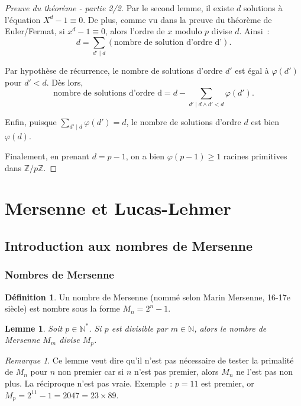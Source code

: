 \documentclass[10pt, mathserif]{beamer}
\newcommand{\Z}{\mathbb Z}
\newcommand{\N}{\mathbb N}
\newtheorem{lem}[thm]{Lemme}
\theoremstyle{definition}
\newtheorem{déf}[thm]{Définition}
\theoremstyle{remark}
\newtheorem*{rmq}{Remarque}
\begin{document}
	\begin{frame}
		\begin{proof}[Preuve du théorème - partie 2/2]
			Par le second lemme, il existe $d$ solutions à l'équation $X^d-1\equiv 0$. De plus, comme vu dans la preuve du théorème de Euler/Fermat,
			si $x^d - 1 \equiv 0$, alors l'ordre de $x$ modulo $p$ divise $d$. Ainsi~:
			\[d = \sum_{d'\mid d}\left(\text{nombre de solution d'ordre d'}\right).\]
			
			Par hypothèse de récurrence, le nombre de solutions d'ordre $d'$ est égal à $\varphi(d')$ pour $d' < d$. Dès lors,
			\[\text{nombre de solutions d'ordre d} = d - \sum_{d' \mid d \land d' < d}\varphi(d').\]

			Enfin, puisque $\sum_{d'\mid d}\varphi(d') = d$, le nombre de solutions d'ordre $d$ est bien $\varphi(d)$.
			
			Finalement, en prenant $d = p-1$, on a bien $\varphi(p-1) \ge 1$ racines primitives dans $\Z/p\Z$.
		\end{proof}
	\end{frame}

\section{Mersenne et Lucas-Lehmer}
	\subsection{Introduction aux nombres de Mersenne}
	\begin{frame}
		\frametitle{Nombres de Mersenne}
		\begin{déf}
			Un nombre de Mersenne (nommé selon Marin Mersenne, 16-17e siècle) est nombre sous la forme $M_n = 2^n-1$.
		\end{déf}

		\begin{lem}
			Soit $p \in \N^*$. Si $p$ est divisible par $m \in \N$, alors le nombre de Mersenne $M_m$ divise $M_p$.
		\end{lem}

		\begin{rmq}
			Ce lemme veut dire qu'il n'est pas nécessaire de tester la primalité de $M_n$ pour $n$ non premier car si $n$ n'est pas premier, alors $M_n$ ne
			l'est pas non plus. La réciproque n'est pas vraie. Exemple~: $p = 11$ est premier, or $M_p = 2^{11}-1 = 2047 = 23 \times 89$.
		\end{rmq}
	\end{frame}
\end{document}
